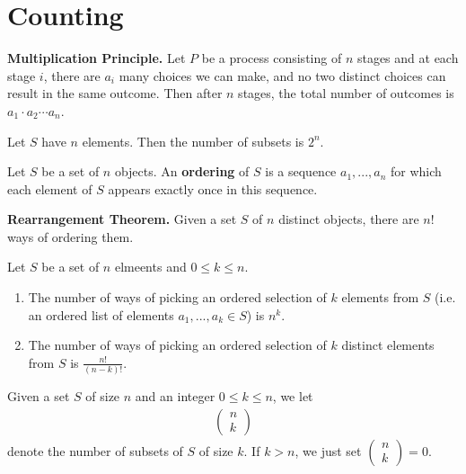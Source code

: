 \documentclass{article}
\begin{document}
\section{Counting}
\begin{theorem}
    \textbf{Multiplication Principle.} Let $P$ be a process consisting of $n$ stages and at each stage $i$, there are $a_i$ many choices we can make, and no two distinct choices can result in the same outcome. 
    Then after $n$ stages, the total number of outcomes is $a_1\cdot a_2\cdots a_n$.
\end{theorem}
\begin{proposition}
    Let $S$ have $n$ elements. Then the number of subsets is $2^n$.    
\end{proposition}
\begin{definition}
    Let $S$ be a set of $n$ objects. An \textbf{ordering} of $S$ is a sequence $a_1,...,a_n$ for which each element of $S$ appears exactly once in this sequence.
\end{definition}
\begin{theorem}
    \textbf{Rearrangement Theorem.} Given a set $S$ of $n$ distinct objects, there are $n!$ ways of ordering them.
\end{theorem}
\begin{proposition}
    Let $S$ be a set of $n$ elmeents and $0\leq k \leq n$.    
    \begin{enumerate}
        \item The number of ways of picking an ordered selection of $k$ elements from $S$ (i.e. an ordered list of elements $a_1, ..., a_k\in S$) is $n^k$.
        \item The number of ways of picking an ordered selection of $k$ distinct elements from $S$ is $\frac{n!}{(n-k)!}$.
    \end{enumerate}
\end{proposition}
\begin{definition}
    Given a set $S$ of size $n$ and an integer $0\leq k \leq n$, we let
    \begin{align*}
        \begin{pmatrix}
            n\\k
        \end{pmatrix}
    \end{align*}
    denote the number of subsets of $S$ of size $k$. If $k>n$, we just set $\begin{pmatrix}
        n\\k
    \end{pmatrix}=0$.
\end{definition}
\end{document}

